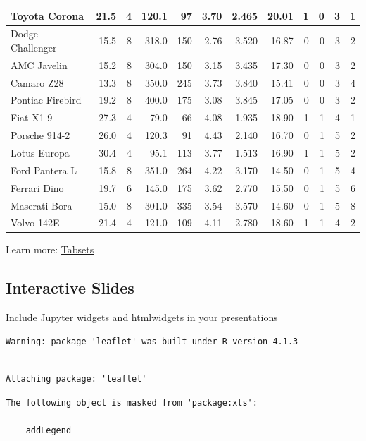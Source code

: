 \documentclass[
  letterpaper,
  DIV=11,
  numbers=noendperiod]{scrartcl}
\begin{document}
\begin{tabular}{l|r|r|r|r|r|r|r|r|r|r|r}
\hline
Toyota Corona & 21.5 & 4 & 120.1 & 97 & 3.70 & 2.465 & 20.01 & 1 & 0 & 3 & 1\\
\hline
Dodge Challenger & 15.5 & 8 & 318.0 & 150 & 2.76 & 3.520 & 16.87 & 0 & 0 & 3 & 2\\
\hline
AMC Javelin & 15.2 & 8 & 304.0 & 150 & 3.15 & 3.435 & 17.30 & 0 & 0 & 3 & 2\\
\hline
Camaro Z28 & 13.3 & 8 & 350.0 & 245 & 3.73 & 3.840 & 15.41 & 0 & 0 & 3 & 4\\
\hline
Pontiac Firebird & 19.2 & 8 & 400.0 & 175 & 3.08 & 3.845 & 17.05 & 0 & 0 & 3 & 2\\
\hline
Fiat X1-9 & 27.3 & 4 & 79.0 & 66 & 4.08 & 1.935 & 18.90 & 1 & 1 & 4 & 1\\
\hline
Porsche 914-2 & 26.0 & 4 & 120.3 & 91 & 4.43 & 2.140 & 16.70 & 0 & 1 & 5 & 2\\
\hline
Lotus Europa & 30.4 & 4 & 95.1 & 113 & 3.77 & 1.513 & 16.90 & 1 & 1 & 5 & 2\\
\hline
Ford Pantera L & 15.8 & 8 & 351.0 & 264 & 4.22 & 3.170 & 14.50 & 0 & 1 & 5 & 4\\
\hline
Ferrari Dino & 19.7 & 6 & 145.0 & 175 & 3.62 & 2.770 & 15.50 & 0 & 1 & 5 & 6\\
\hline
Maserati Bora & 15.0 & 8 & 301.0 & 335 & 3.54 & 3.570 & 14.60 & 0 & 1 & 5 & 8\\
\hline
Volvo 142E & 21.4 & 4 & 121.0 & 109 & 4.11 & 2.780 & 18.60 & 1 & 1 & 4 & 2\\
\hline
\end{tabular}

Learn more:
\href{https://quarto.org/docs/presentations/revealjs/\#tabsets}{Tabsets}

\hypertarget{interactive-slides}{%
\subsection{Interactive Slides}\label{interactive-slides}}

Include Jupyter widgets and htmlwidgets in your presentations

\begin{verbatim}
Warning: package 'leaflet' was built under R version 4.1.3
\end{verbatim}

\begin{verbatim}

Attaching package: 'leaflet'
\end{verbatim}

\begin{verbatim}
The following object is masked from 'package:xts':

    addLegend
\end{verbatim}
\end{document}
